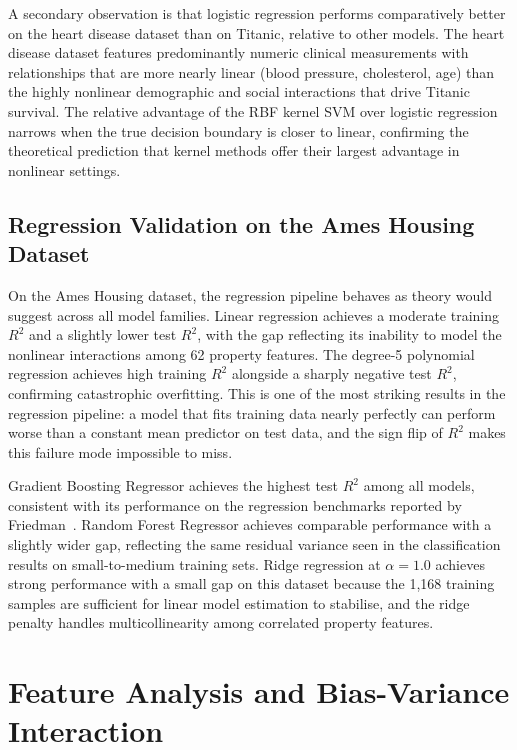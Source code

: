 \documentclass[conference]{IEEEtran}
\begin{document}
A secondary observation is that logistic regression performs comparatively better on the heart disease dataset than on Titanic, relative to other models. The heart disease dataset features predominantly numeric clinical measurements with relationships that are more nearly linear (blood pressure, cholesterol, age) than the highly nonlinear demographic and social interactions that drive Titanic survival. The relative advantage of the RBF kernel SVM over logistic regression narrows when the true decision boundary is closer to linear, confirming the theoretical prediction that kernel methods offer their largest advantage in nonlinear settings.

\subsection{Regression Validation on the Ames Housing Dataset}

On the Ames Housing dataset, the regression pipeline behaves as theory would suggest across all model families. Linear regression achieves a moderate training $R^2$ and a slightly lower test $R^2$, with the gap reflecting its inability to model the nonlinear interactions among 62 property features. The degree-5 polynomial regression achieves high training $R^2$ alongside a sharply negative test $R^2$, confirming catastrophic overfitting. This is one of the most striking results in the regression pipeline: a model that fits training data nearly perfectly can perform worse than a constant mean predictor on test data, and the sign flip of $R^2$ makes this failure mode impossible to miss.

Gradient Boosting Regressor achieves the highest test $R^2$ among all models, consistent with its performance on the regression benchmarks reported by Friedman~\cite{b13}. Random Forest Regressor achieves comparable performance with a slightly wider gap, reflecting the same residual variance seen in the classification results on small-to-medium training sets. Ridge regression at $\alpha = 1.0$ achieves strong performance with a small gap on this dataset because the 1,168 training samples are sufficient for linear model estimation to stabilise, and the ridge penalty handles multicollinearity among correlated property features.

\section{Feature Analysis and Bias-Variance Interaction}
\end{document}
